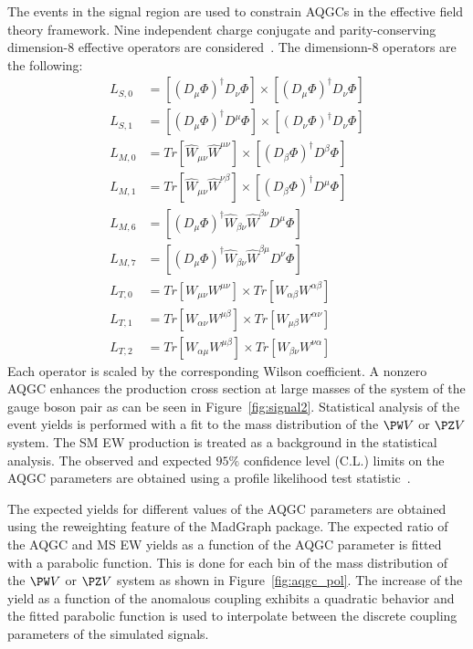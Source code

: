 The events in the signal region are used to constrain AQGCs in the effective field theory framework. Nine independent charge conjugate and parity-conserving dimension-8 effective operators are considered~\cite{aqgc_operators}. The dimensionn-8 operators are the following: 
%
\begin{align*}
L_{S,0} &= \left[\left(D_{\mu} \Phi\right)^{\dagger} D_{\nu} \Phi \right] \times \left[\left(D_{\mu} \Phi\right)^{\dagger} D_{\nu} \Phi \right] \\
L_{S,1} &= \left[\left(D_{\mu} \Phi\right)^{\dagger} D^{\mu} \Phi \right] \times \left[\left(D_{\nu} \Phi\right)^{\dagger} D_{\nu} \Phi \right] \\
L_{M,0} &= Tr[\hat{W}_{\mu \nu} \hat{W}^{\mu \nu}] \times \left[ \left(D_{\beta} \Phi\right)^{\dagger} D^{\beta} \Phi \right] \\
L_{M,1} &= Tr[\hat{W}_{\mu \nu} \hat{W}^{\nu \beta}] \times \left[ \left(D_{\beta} \Phi\right)^{\dagger} D^{\mu} \Phi \right] \\
L_{M,6} &= \left[\left(D_{\mu} \Phi\right)^{\dagger}  \hat{W}_{\beta \nu} \hat{W}^{\beta \nu}  D^{\mu} \Phi \right] \\
L_{M,7} &= \left[\left(D_{\mu} \Phi\right)^{\dagger} \hat{W}_{\beta \nu} \hat{W}^{\beta \mu} D^{\nu} \Phi \right ] \\
L_{T,0} &= Tr \left[W_{\mu \nu} W^{\mu \nu} \right] \times Tr \left[W_{\alpha \beta} W^{\alpha \beta} \right] \\
L_{T,1} &= Tr \left[W_{\alpha \nu} W^{\mu \beta} \right] \times Tr \left[W_{\mu \beta} W^{\alpha \nu} \right] \\
L_{T,2} &= Tr \left[W_{\alpha \mu} W^{\mu \beta} \right] \times Tr \left[W_{\beta \nu} W^{\nu \alpha} \right]
\end{align*}
%
Each operator is scaled by the corresponding Wilson coefficient. A nonzero AQGC enhances the production cross section at large masses of the system of the gauge boson pair as can be seen in Figure~\ref{fig:signal2}. Statistical analysis of the event yields is performed with a fit to the mass distribution of the $\PW V$ or $\PZ V$ system. The SM EW production is treated as a background in the statistical analysis. The observed and expected $95\%$ confidence level (C.L.) limits on the AQGC parameters are obtained using a profile likelihood test statistic~\cite{Junk,Read,CLs}. 

The expected yields for different values of the AQGC parameters are obtained using the reweighting feature of the MadGraph package. The expected ratio of the AQGC and MS EW yields as a function of the AQGC parameter is fitted with a parabolic function. This is done for each bin of the mass distribution of the $\PW V$ or $\PZ V$ system as shown in Figure~\ref{fig:aqgc_pol}. The increase of the yield as a function of the anomalous coupling exhibits a quadratic behavior and the fitted parabolic function is used to interpolate between the discrete coupling parameters of the simulated signals.      

